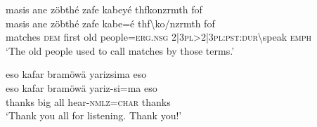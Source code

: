 \ea\label{ex:11:a2601}
masis ane zöbthé zafe kabeyé thfkonzrmth fof\\
\gll masis	ane	zöbthé	zafe	kabe=é	thf{\textbackslash}ko/nzrmth	fof\\
     matches	\textsc{dem}	first	old	people=\textsc{erg}.\textsc{nsg}	2|3\textsc{pl}>2|3\textsc{pl}:\textsc{pst}:\textsc{dur}{\textbackslash}speak	\textsc{emph}\\
\glt `The old people used to call matches by those terms.'
\z

\ea\label{ex:11:a2602}
eso kafar bramöwä yarizsima eso\\
\gll eso	kafar	bramöwä	yariz-si=ma	eso\\
     thanks	big	all	hear-\textsc{nmlz}=\textsc{char}	thanks\\
\glt `Thank you all for listening. Thank you!'
\z
